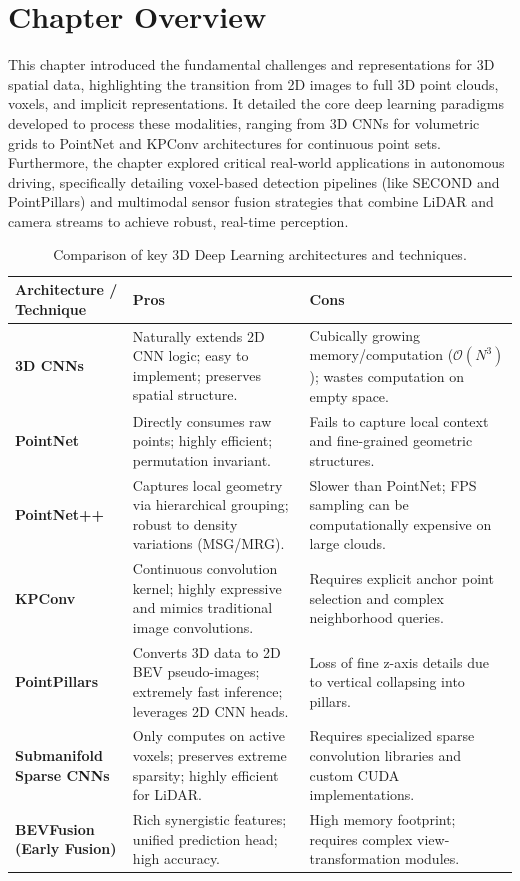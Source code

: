 \section{Chapter Overview}

This chapter introduced the fundamental challenges and representations for 3D spatial data, highlighting the transition from 2D images to full 3D point clouds, voxels, and implicit representations. It detailed the core deep learning paradigms developed to process these modalities, ranging from 3D CNNs for volumetric grids to PointNet and KPConv architectures for continuous point sets. Furthermore, the chapter explored critical real-world applications in autonomous driving, specifically detailing voxel-based detection pipelines (like SECOND and PointPillars) and multimodal sensor fusion strategies that combine LiDAR and camera streams to achieve robust, real-time perception.

\begin{table}[h]
\centering
\begin{tabularx}{\textwidth}{| >{\centering\arraybackslash}m{3.5cm} | X | X |}
\hline
\textbf{Architecture / Technique} & \textbf{Pros} & \textbf{Cons} \\
\hline
\textbf{3D CNNs} & Naturally extends 2D CNN logic; easy to implement; preserves spatial structure. & Cubically growing memory/computation ($\mathcal{O}(N^3)$); wastes computation on empty space. \\
\hline
\textbf{PointNet} & Directly consumes raw points; highly efficient; permutation invariant. & Fails to capture local context and fine-grained geometric structures. \\
\hline
\textbf{PointNet++} & Captures local geometry via hierarchical grouping; robust to density variations (MSG/MRG). & Slower than PointNet; FPS sampling can be computationally expensive on large clouds. \\
\hline
\textbf{KPConv} & Continuous convolution kernel; highly expressive and mimics traditional image convolutions. & Requires explicit anchor point selection and complex neighborhood queries. \\
\hline
\textbf{PointPillars} & Converts 3D data to 2D BEV pseudo-images; extremely fast inference; leverages 2D CNN heads. & Loss of fine z-axis details due to vertical collapsing into pillars. \\
\hline
\textbf{Submanifold Sparse CNNs} & Only computes on active voxels; preserves extreme sparsity; highly efficient for LiDAR. & Requires specialized sparse convolution libraries and custom CUDA implementations. \\
\hline
\textbf{BEVFusion (Early Fusion)} & Rich synergistic features; unified prediction head; high accuracy. & High memory footprint; requires complex view-transformation modules. \\
\hline
\end{tabularx}
\caption{Comparison of key 3D Deep Learning architectures and techniques.}
\label{tab:3d_architectures_comparison}
\end{table}

